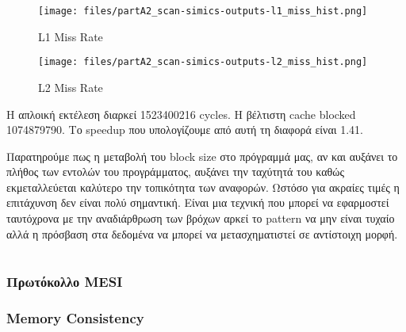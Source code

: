 \documentclass[a4paper,12pt]{article}
\begin{document}
\begin{figure}[H]
	\centering
    \texttt{[image: files/partA2\_scan-simics-outputs-l1\_miss\_hist.png]}
    \caption{L1 Miss Rate}
	\label{fig:B2}
\end{figure}

\begin{figure}[H]
	\centering
    \texttt{[image: files/partA2\_scan-simics-outputs-l2\_miss\_hist.png]}
    \caption{L2 Miss Rate}
	\label{fig:B3}
\end{figure}


Η απλοική εκτέλεση διαρκεί 1523400216 cycles. H βέλτιστη cache blocked
1074879790. Το speedup που υπολογίζουμε από αυτή τη διαφορά είναι 1.41.


Παρατηρούμε πως η μεταβολή του block size στο πρόγραμμά μας, αν και αυξάνει το πλήθος των
εντολών του προγράμματος, αυξάνει την ταχύτητά του καθώς εκμεταλλεύεται
καλύτερο την τοπικότητα των αναφορών. Ωστόσο για ακραίες τιμές η επιτάχυνση
δεν είναι πολύ σημαντική. Είναι μια τεχνική που μπορεί να εφαρμοστεί
ταυτόχρονα με την αναδιάρθρωση των βρόχων αρκεί το pattern να μην είναι τυχαίο
αλλά η πρόσβαση στα δεδομένα να μπορεί να μετασχηματιστεί σε αντίστοιχη μορφή.


\setcounter{section}{0}
\part{}
\section{Πρωτόκολλο MESI}
\section{Memory Consistency}
\end{document}
